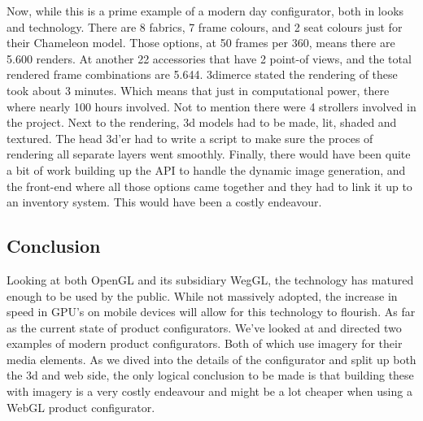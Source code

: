 \linebreak
Now, while this is a prime example of a modern day configurator, both in looks and technology. There are 8 fabrics, 7 frame colours, and 2 seat colours just for their Chameleon model. Those options, at 50 frames per 360, means there are 5.600 renders. At another 22 accessories that have 2 point-of views, and the total rendered frame combinations are 5.644. 3dimerce stated the rendering of these took about 3 minutes. Which means that just in computational power, there where nearly 100 hours involved. Not to mention there were 4 strollers involved in the project.
Next to the rendering, 3d models had to be made, lit, shaded and textured. The head 3d'er had to write a script to make sure the proces of rendering all separate layers went smoothly.
Finally, there would have been quite a bit of work building up the API to handle the dynamic image generation, and the front-end where all those options came together and they had to link it up to an inventory system.
This would have been a costly endeavour.

\subsection{Conclusion}
Looking at both OpenGL and its subsidiary WegGL, the technology has matured enough to be used by the public. While not massively adopted, the increase in speed in GPU's on mobile devices will allow for this technology to flourish.
As far as the current state of product configurators. We've looked at and directed two examples of modern product configurators. Both of which use imagery for their media elements. As we dived into the details of the configurator and split up both the 3d and web side, the only logical conclusion to be made is that building these with imagery is a very costly endeavour and might be a lot cheaper when using a WebGL product configurator.

\newpage